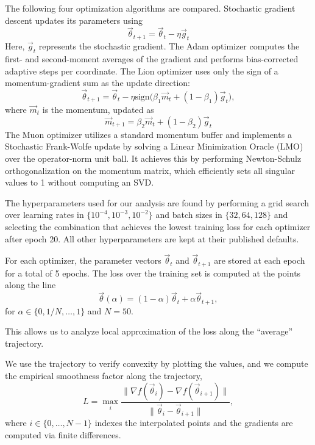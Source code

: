 \documentclass[10pt,conference,compsocconf]{IEEEtran}
\begin{document}
The following four optimization algorithms are compared. Stochastic gradient descent updates its
parameters using
\begin{equation*}
    \vec{\theta}_{t+1} = \vec{\theta}_t - \eta \vec{g}_t
\end{equation*}
Here, $\vec{g}_t$ represents the stochastic gradient. The Adam optimizer computes the first- and
second-moment averages of the gradient and performs bias-corrected adaptive steps per coordinate.
The Lion optimizer uses only the sign of a momentum-gradient sum as the update direction:
\begin{equation*}
    \vec{\theta}_{t+1} = \vec{\theta}_t -
                \eta \mathrm{sign}\bigl(\beta_1 \vec{m}_t + (1-\beta_1) \vec{g}_t\bigr),
\end{equation*}
where $\vec{m}_t$ is the momentum, updated as
\begin{equation*}
    \vec{m}_{t+1} = \beta_2 \vec{m}_t + (1-\beta_2) \vec{g}_t
\end{equation*}
The Muon optimizer utilizes a standard momentum buffer and implements a Stochastic Frank-Wolfe
update by solving a Linear Minimization Oracle (LMO) over the operator-norm unit ball. It achieves
this by performing Newton-Schulz orthogonalization on the momentum matrix, which efficiently sets
all singular values to 1 without computing an SVD.

The hyperparameters used for our analysis are found by performing a grid search over learning rates
in $\{10^{-4}, 10^{-3}, 10^{-2}\}$ and batch sizes in $\{32, 64, 128\}$ and selecting the
combination that achieves the lowest training loss for each optimizer after epoch 20.
All other hyperparameters are kept at their published defaults.

For each optimizer, the parameter vectors $\vec{\theta}_t$ and $\vec{\theta}_{t+1}$ are stored at
each epoch for a total of 5 epochs.
The loss over the training set is computed at the points along the line
\begin{equation*}
    \vec{\theta}(\alpha) = (1-\alpha)\vec{\theta}_t + \alpha\vec{\theta}_{t+1},
\end{equation*}
for $\alpha \in \{0, 1/N, \ldots, 1\}$ and $N=50$.

This allows us to analyze local approximation of the loss along the ``average'' trajectory.

We use the trajectory to verify convexity by plotting the values, and we compute the empirical
smoothness factor along the trajectory,
$$ L = \max_i \frac{\lVert \nabla f(\vec{\theta}_i) - \nabla f(\vec{\theta}_{i+1}) \rVert}
                    {\lVert \vec{\theta}_i - \vec{\theta}_{i+1} \rVert}, $$
where $i \in \{0, \ldots, N-1\}$ indexes the interpolated points and the gradients are computed via
finite differences.
\end{document}

